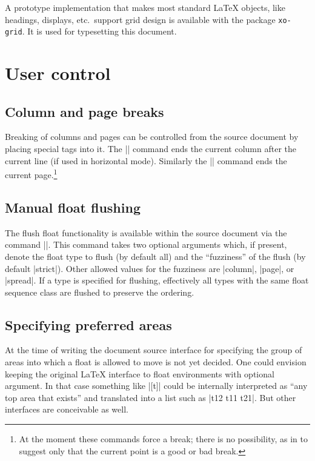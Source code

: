 \documentclass[twocolumn]{article}
\begin{document}
A prototype implementation that makes most standard \LaTeX{} objects,
like headings, displays, etc.\ support grid design is available with
the package \texttt{xo-grid}. It is used for typesetting this
document.


\section{User control}


\subsection{Column and page breaks}

Breaking of columns and pages can be controlled from the source
document by placing special tags into it. The |\columnbreak| command
ends the current column after the current line (if used in horizontal
mode). Similarly the |\pagebreak| command ends the current
page.\footnote{At the moment these commands force a break; there is no
possibility, as in \LaTeXe{} to suggest only that the current point
is a good  or bad break.}


\subsection{Manual float flushing}

The flush float functionality is available within the source document
via the command |\flushfloats|. This command takes two optional arguments
which, if present, denote the float type to flush (by default all) and the
``fuzziness'' of the flush (by default |strict|). Other allowed values
for the fuzziness are |column|, |page|, or |spread|. If a type is
specified for flushing, effectively all types with the same float
sequence class are flushed to preserve the ordering.



\subsection{Specifying preferred areas}

At the time of writing the document source interface for specifying
the group of areas into which a float is allowed to move is not yet
decided. One could envision keeping the original \LaTeX{} interface to
float environments with optional argument. In that case something like
|[t]| could be internally interpreted as ``any top area that exists''
and translated into a list such as |t12 t11 t21|. But other interfaces
are conceivable as well.
\end{document}
